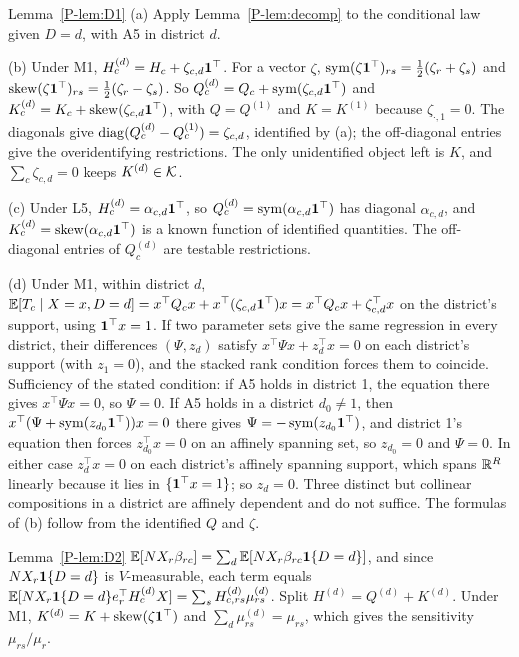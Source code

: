 \begin{proofof}{Lemma~\ref{P-lem:D1}}
(a) Apply Lemma~\ref{P-lem:decomp} to the conditional law given $D=d$, with A5 in
district $d$.

(b) Under M1, $H^{(d)}_c=H_c+\zeta_{c,d}\mathbf 1^\top$. For a vector $\zeta$,
$\operatorname{sym}(\zeta\mathbf 1^\top)_{rs}=\tfrac12(\zeta_r+\zeta_s)$ and
$\operatorname{skew}(\zeta\mathbf 1^\top)_{rs}=\tfrac12(\zeta_r-\zeta_s)$. So
$Q^{(d)}_c=Q_c+\operatorname{sym}(\zeta_{c,d}\mathbf 1^\top)$ and $K^{(d)}_c=K_c+\operatorname{skew}(\zeta_{c,d}\mathbf 1^\top)$,
with $Q=Q^{(1)}$ and $K=K^{(1)}$ because $\zeta_{\cdot,1}=0$. The diagonals give
$\operatorname{diag}(Q^{(d)}_c-Q^{(1)}_c)=\zeta_{c,d}$, identified by (a); the off-diagonal entries
give the overidentifying restrictions. The only unidentified object left is $K$, and
$\sum_c\zeta_{c,d}=0$ keeps $K^{(d)}\in\mathcal K$.

(c) Under L5, $H^{(d)}_c=\alpha_{c,d}\mathbf 1^\top$, so $Q^{(d)}_c=\operatorname{sym}(\alpha_{c,d}\mathbf 1^\top)$
has diagonal $\alpha_{c,d}$, and $K^{(d)}_c=\operatorname{skew}(\alpha_{c,d}\mathbf 1^\top)$ is a known
function of identified quantities. The off-diagonal entries of $Q^{(d)}_c$ are testable
restrictions.

(d) Under M1, within district $d$,
$\mathbb E[T_c\mid X=x,D=d]=x^\top Q_cx+x^\top(\zeta_{c,d}\mathbf 1^\top)x=x^\top Q_cx+\zeta_{c,d}^\top x$
on the district's support, using $\mathbf 1^\top x=1$. If two parameter sets give the same
regression in every district, their differences $(\Psi,z_d)$ satisfy
$x^\top\Psi x+z_d^\top x=0$ on each district's support (with $z_1=0$), and the stacked
rank condition forces them to coincide. Sufficiency of the stated condition: if A5
holds in district 1, the equation there gives $x^\top\Psi x=0$, so $\Psi=0$. If A5
holds in a district $d_0\neq1$, then
$x^\top(\Psi+\operatorname{sym}(z_{d_0}\mathbf 1^\top))x=0$ there gives $\Psi=-\operatorname{sym}(z_{d_0}\mathbf 1^\top)$, and
district 1's equation then forces $z_{d_0}^\top x=0$ on an affinely spanning set, so
$z_{d_0}=0$ and $\Psi=0$. In either case $z_d^\top x=0$ on each district's affinely
spanning support, which spans $\mathbb R^R$ linearly because it lies in $\{\mathbf 1^\top x=1\}$; so
$z_d=0$. Three distinct but collinear compositions in a district are affinely
dependent and do not suffice. The formulas of (b) follow from the identified $Q$ and
$\zeta$.
\end{proofof}

\begin{proofof}{Lemma~\ref{P-lem:D2}}
$\mathbb E[NX_r\beta_{rc}]=\sum_d\mathbb E[NX_r\beta_{rc}\mathbf 1\{D=d\}]$, and since $NX_r\mathbf 1\{D=d\}$ is
$V$-measurable, each term equals
$\mathbb E[NX_r\mathbf 1\{D=d\}e_r^\top H^{(d)}_cX]=\sum_sH^{(d)}_{c,rs}\mu^{(d)}_{rs}$. Split
$H^{(d)}=Q^{(d)}+K^{(d)}$. Under M1, $K^{(d)}=K+\operatorname{skew}(\zeta\mathbf 1^\top)$ and
$\sum_d\mu^{(d)}_{rs}=\mu_{rs}$, which gives the sensitivity $\mu_{rs}/\mu_r$.
\end{proofof}

